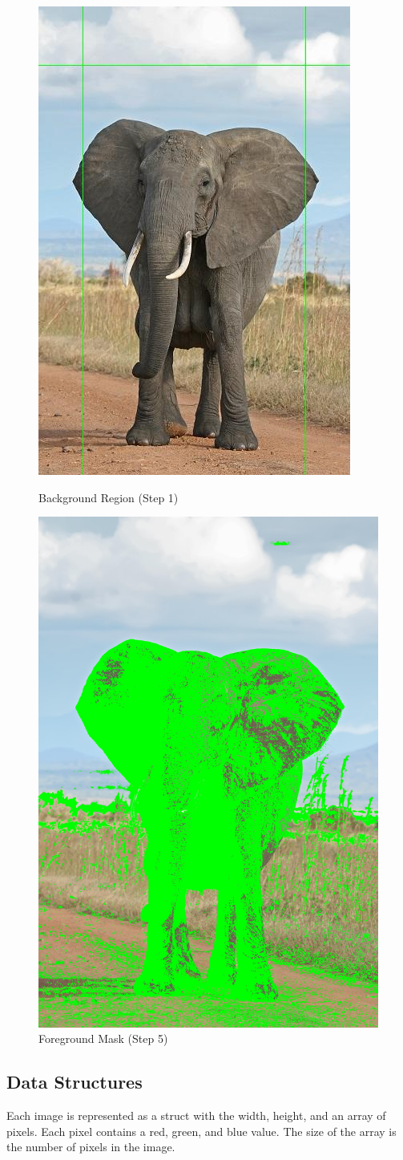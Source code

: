 \documentclass[12pt]{article}
\begin{document}
\begin{figure}[!htb]
    \begin{minipage}{0.48\textwidth}
        \centering
        \includegraphics[width=0.5\linewidth]{border.jpg}
        \caption{Background Region (Step 1)}
    \end{minipage}\hfill
    \begin{minipage}{0.48\textwidth}
        \centering
        \includegraphics[width=0.5\linewidth]{mask.jpg}
        \caption{Foreground Mask (Step 5)}
    \end{minipage}\hfill
\end{figure}

\subsection{Data Structures}
Each image is represented as a struct with the width, height, and an array of
pixels. Each pixel contains a red, green, and blue value. The size of the array
is the number of pixels in the image.
\end{document}
